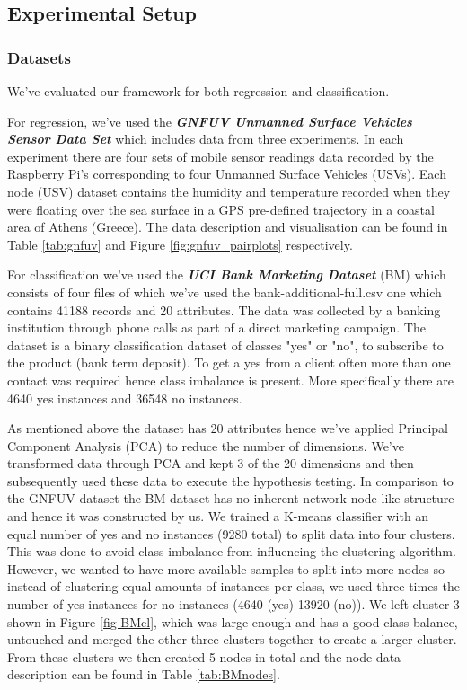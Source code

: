 \documentclass{mpaper}
\begin{document}
\subsection{Experimental Setup}

\subsubsection{Datasets}\label{chap:training_data}

We've evaluated our framework for both regression and classification. 

For regression, we've used the \textbf{\textit{GNFUV Unmanned Surface Vehicles Sensor Data Set}} \cite{GNFUV} which includes data from three experiments. In each experiment there are four sets of mobile sensor readings data recorded by the Raspberry Pi's corresponding to four Unmanned Surface Vehicles (USVs). Each node (USV) dataset contains the humidity and temperature recorded when they were floating over the sea surface in a GPS pre-defined trajectory in a coastal area of Athens (Greece). The data description and visualisation can be found in Table \ref{tab:gnfuv} and Figure \ref{fig:gnfuv_pairplots} respectively. 

For classification we've used the \textbf{\textit{UCI Bank Marketing Dataset}} (BM) \cite{BMDataset} which consists of four files of which we've used the bank-additional-full.csv one which contains 41188 records and 20 attributes. The data was collected by a banking institution through phone calls as part of a direct marketing campaign. The dataset is a binary classification dataset of classes "yes" or "no", to subscribe to the product (bank term deposit). To get a yes from a client often more than one contact was required hence class imbalance is present. More specifically there are 4640 yes instances and 36548 no instances. 

As mentioned above the dataset has 20 attributes hence we've applied Principal Component Analysis (PCA) to reduce the number of dimensions. We've transformed data through PCA and kept 3 of the 20 dimensions and then subsequently used these data to execute the hypothesis testing. In comparison to the GNFUV dataset the BM dataset has no inherent network-node like structure and hence it was constructed by us. We trained a K-means classifier with an equal number of yes and no instances (9280 total) to split data into four clusters. This was done to avoid class imbalance from influencing the clustering algorithm. However, we wanted to have more available samples to split into more nodes so instead of clustering equal amounts of instances per class, we used three times the number of yes instances for no instances (4640 (yes) 13920 (no)). We left cluster 3 shown in Figure \ref{fig-BMcl}, which was large enough and has a good class balance, untouched and merged the other three clusters together to create a larger cluster. From these clusters we then created 5 nodes in total and the node data description can be found in Table \ref{tab:BMnodes}. 
\end{document}
